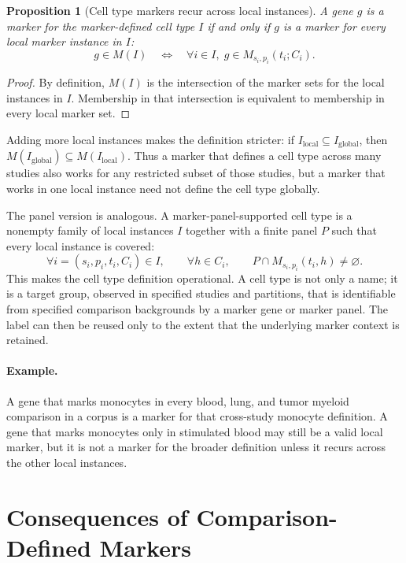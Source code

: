 \documentclass{article}
\newtheorem{proposition}{Proposition}
\begin{document}
\begin{proposition}[Cell type markers recur across local instances]\label{prop:cell-type-marker-recurrence}
A gene $g$ is a marker for the marker-defined cell type $I$ if and only if $g$ is a marker for every local marker instance in $I$:
\[
  g\in M(I)
  \quad\Longleftrightarrow\quad
  \forall i\in I,\; g\in M_{s_i,p_i}(t_i;C_i).
\]
\end{proposition}

\begin{proof}
By definition, $M(I)$ is the intersection of the marker sets for the local instances in $I$. Membership in that intersection is equivalent to membership in every local marker set.
\end{proof}

Adding more local instances makes the definition stricter: if $I_{\mathrm{local}}\subseteq I_{\mathrm{global}}$, then $M(I_{\mathrm{global}})\subseteq M(I_{\mathrm{local}})$. Thus a marker that defines a cell type across many studies also works for any restricted subset of those studies, but a marker that works in one local instance need not define the cell type globally.

The panel version is analogous. A marker-panel-supported cell type is a nonempty family of local instances $I$ together with a finite panel $P$ such that every local instance is covered:
\[
  \forall i=(s_i,p_i,t_i,C_i)\in I,\qquad
  \forall h\in C_i,\qquad
  P\cap M_{s_i,p_i}(t_i,h)\neq\varnothing.
\]
This makes the cell type definition operational. A cell type is not only a name; it is a target group, observed in specified studies and partitions, that is identifiable from specified comparison backgrounds by a marker gene or marker panel. The label can then be reused only to the extent that the underlying marker context is retained.

\paragraph{Example.}
A gene that marks monocytes in every blood, lung, and tumor myeloid comparison in a corpus is a marker for that cross-study monocyte definition. A gene that marks monocytes only in stimulated blood may still be a valid local marker, but it is not a marker for the broader definition unless it recurs across the other local instances.

\section{Consequences of Comparison-Defined Markers}
\end{document}
